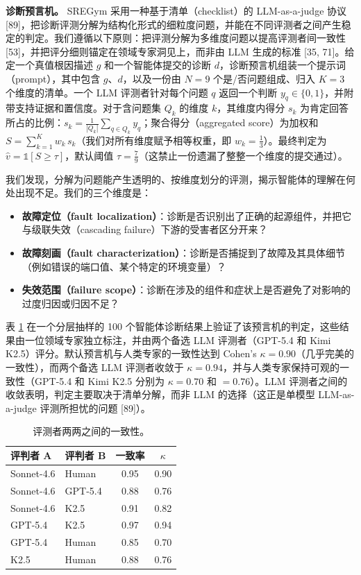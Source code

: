 \documentclass[11pt,UTF8,fontset=fandol]{ctexart}
\begin{document}
\textbf{诊断预言机。} SREGym 采用一种基于清单（checklist）的 LLM-as-a-judge 协议 [89]，把诊断评测分解为结构化形式的细粒度问题，并能在不同评测者之间产生稳定的判定。我们遵循以下原则：把评测分解为多维度问题以提高评测者间一致性 [53]，并把评分细则锚定在领域专家洞见上，而非由 LLM 生成的标准 [35, 71]。给定一个真值根因描述 $g$ 和一个智能体提交的诊断 $d$，诊断预言机组装一个提示词（prompt），其中包含 $g$、$d$，以及一份由 $N = 9$ 个是/否问题组成、归入 $K = 3$ 个维度的清单。一个 LLM 评测者针对每个问题 $q$ 返回一个判断 $y_q \in \{0, 1\}$，并附带支持证据和置信度。对于含问题集 $Q_k$ 的维度 $k$，其维度内得分 $s_k$ 为肯定回答所占的比例：$s_k = \frac{1}{|Q_k|}\sum_{q\in Q_k} y_q$；聚合得分（aggregated score）为加权和 $S = \sum_{k=1}^{K} w_k\, s_k$（我们对所有维度赋予相等权重，即 $w_k = \tfrac{1}{3}$）。最终判定为 $\hat{v} = \mathbb{1}[S \geq \tau]$，默认阈值 $\tau = \tfrac{7}{9}$（这禁止一份遗漏了整整一个维度的提交通过）。

我们发现，分解为问题能产生透明的、按维度划分的评测，揭示智能体的理解在何处出现不足。我们的三个维度是：

\begin{itemize}[leftmargin=1.5em]
\item \textbf{故障定位（fault localization）}：诊断是否识别出了正确的起源组件，并把它与级联失效（cascading failure）下游的受害者区分开来？
\item \textbf{故障刻画（fault characterization）}：诊断是否捕捉到了故障及其具体细节（例如错误的端口值、某个特定的环境变量）？
\item \textbf{失效范围（failure scope）}：诊断在涉及的组件和症状上是否避免了对影响的过度归因或归因不足？
\end{itemize}

表 \ref{tab:2} 在一个分层抽样的 100 个智能体诊断结果上验证了该预言机的判定，这些结果由一位领域专家独立标注，并由两个备选 LLM 评测者（GPT-5.4 和 Kimi K2.5）评分。默认预言机与人类专家的一致性达到 Cohen's $\kappa = 0.90$（几乎完美的一致性），而两个备选 LLM 评测者收敛于 $\kappa = 0.94$，并与人类专家保持可观的一致性（GPT-5.4 和 Kimi K2.5 分别为 $\kappa = 0.70$ 和 $= 0.76$）。LLM 评测者之间的收敛表明，判定主要取决于清单分解，而非 LLM 的选择（这正是单模型 LLM-as-a-judge 评测所担忧的问题 [89]）。

\begin{table}[H]\centering
\caption{评测者两两之间的一致性。}
\label{tab:2}
\begin{tabular}{llcc}
\toprule
评判者 A & 评判者 B & 一致率 & $\kappa$ \\
\midrule
Sonnet-4.6 & Human & 0.95 & 0.90 \\
Sonnet-4.6 & GPT-5.4 & 0.88 & 0.76 \\
Sonnet-4.6 & K2.5 & 0.91 & 0.82 \\
GPT-5.4 & K2.5 & 0.97 & 0.94 \\
GPT-5.4 & Human & 0.85 & 0.70 \\
K2.5 & Human & 0.88 & 0.76 \\
\bottomrule
\end{tabular}
\end{table}
\end{document}
